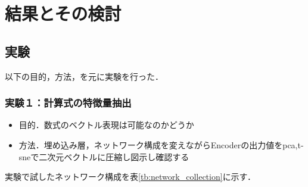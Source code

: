 \documentclass[a4j,11pt,report]{jsbook}
\begin{document}
\chapter{結果とその検討 \label{ch:result}}


\section{実験}
以下の目的，方法，を元に実験を行った．
\subsection{実験１：計算式の特徴量抽出}
\begin{itemize}
  \item 目的．数式のベクトル表現は可能なのかどうか
  \item 方法．埋め込み層，ネットワーク構成を変えながらEncoderの出力値をpca,t-sneで二次元ベクトルに圧縮し図示し確認する
\end{itemize}

実験で試したネットワーク構成を表\ref{tb:network_collection}に示す．
\end{document}
